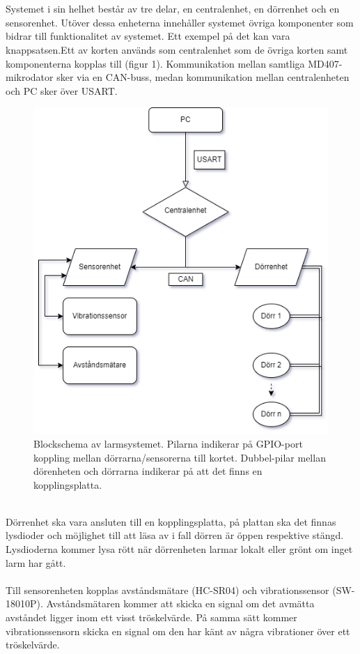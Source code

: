 \documentclass{article}
\begin{document}
\\
\\
\noindent
Systemet i sin helhet består av tre delar, en centralenhet, en dörrenhet och en sensorenhet. Utöver dessa enheterna innehåller systemet övriga komponenter som bidrar till funktionalitet av systemet. Ett exempel på det kan vara knappsatsen.Ett av korten används som centralenhet som de övriga korten samt komponenterna kopplas till (figur 1). Kommunikation mellan samtliga MD407-mikrodator sker via en CAN-buss, medan kommunikation mellan centralenheten och PC sker över USART.
\\
\begin{figure}[h]
    \centering
    \includegraphics[scale=0.6]{Projektrapport/diagram.png}
     \caption {Blockschema av larmsystemet. Pilarna indikerar på GPIO-port koppling mellan dörrarna/sensorerna till kortet. Dubbel-pilar mellan dörenheten och dörrarna indikerar på att det finns en kopplingsplatta.}
    \label{fig:drawing}
\end{figure}
\newpage
\\
\noindent
Dörrenhet ska vara ansluten till en kopplingsplatta, på plattan ska det finnas lysdioder och möjlighet till att läsa av i fall dörren är öppen respektive stängd.
Lysdioderna kommer lysa rött när dörrenheten larmar lokalt eller grönt om inget larm har gått.
\\
\\
Till sensorenheten kopplas avståndsmätare (HC-SR04) och vibrationssensor (SW-18010P).
Avståndsmätaren kommer att skicka en signal om det avmätta avståndet ligger inom ett visst tröskelvärde.
På samma sätt kommer vibrationssensorn skicka en signal om den har känt av några vibrationer över ett tröskelvärde.
\end{document}
